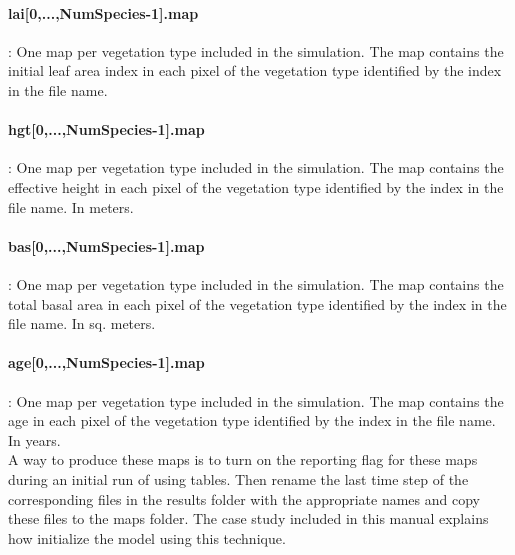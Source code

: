 \paragraph{lai[0,...,NumSpecies-1].map}: One map per vegetation type included in the simulation. The map contains the initial leaf area index in each pixel of the vegetation type identified by the index in the file name.

\paragraph{hgt[0,...,NumSpecies-1].map}: One map per vegetation type included in the simulation. The map contains the effective height in each pixel of the vegetation type identified by the index in the file name. In meters. 

\paragraph{bas[0,...,NumSpecies-1].map}: One map per vegetation type included in the simulation. The map contains the total basal area in each pixel of the vegetation type identified by the index in the file name. In sq. meters.

\paragraph{age[0,...,NumSpecies-1].map}: One map per vegetation type included in the simulation. The map contains the age in each pixel of the vegetation type identified by the index in the file name. In years.\\

A way to produce these maps is to turn on the reporting flag for these maps during an initial run of \echo using tables. Then rename the last time step of the corresponding files in the results folder with the appropriate names and copy these files to the maps folder. The case study included in this manual explains how initialize the model using this technique. 
